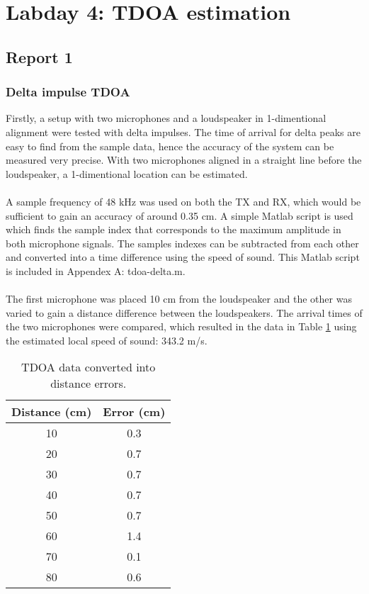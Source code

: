 \documentclass[final]{scrreprt} %
\begin{document}
\section{Labday 4: TDOA estimation}
\subsection{Report 1}
\subsubsection{Delta impulse TDOA}
Firstly, a setup with two microphones and a loudspeaker in 1-dimentional alignment were tested with delta impulses.
The time of arrival for delta peaks are easy to find from the sample data, hence the accuracy of the system can be measured very precise.
With two microphones aligned in a straight line before the loudspeaker, a 1-dimentional location can be estimated.
\\ \\
A sample frequency of 48 kHz was used on both the TX and RX, which would be sufficient to gain an accuracy of around 0.35 cm.
A simple Matlab script is used which finds the sample index that corresponds to the maximum amplitude in both microphone signals.
The samples indexes can be subtracted from each other and converted into a time difference using the speed of sound.
This Matlab script is included in Appendex A: tdoa-delta.m.
\\ \\
The first microphone was placed 10 cm from the loudspeaker and the other was varied to gain a distance difference between the loudspeakers.
The arrival times of the two microphones were compared, which resulted in the data in Table \ref{tab:delta} using the estimated local speed of sound: 343.2 m/s.

\begin{table} [H]
	\centering
	\begin{tabular} { c | c }
	Distance (cm) & Error (cm) \\ \hline
	10 & 0.3 \\
	20 & 0.7 \\
	30 & 0.7 \\
	40 & 0.7 \\
	50 & 0.7 \\
	60 & 1.4 \\
	70 & 0.1 \\
	80 & 0.6 \\
	\end{tabular}
\caption{TDOA data converted into distance errors.}
\label{tab:delta}
\end{table}
\end{document}
